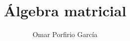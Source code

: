 




\newcommand\course{Matemáticas}
\newcommand\Informationa{Omar Porfirio García}



\author{Omar Porfirio García}

\title{Álgebra matricial}
